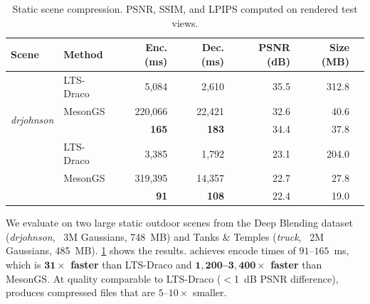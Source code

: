 %
\begin{table}[t]
  \centering
  {
  \begin{tabular}{l|l|rr|rrr}
    \hline
    \textbf{Scene} & \textbf{Method} & \textbf{Enc.} (ms) & \textbf{Dec.} (ms) & \textbf{PSNR} (dB) & \textbf{Size} (MB) \\
    \hline\hline
    \multirow{4}{*}{\textit{drjohnson}}
      & LTS-Draco            & 5,084    & 2,610   & 35.5 & 312.8 \\
      & MesonGS              & 220,066  & 22,421  & 32.6 & 40.6 \\
      & \textbf{\gsnfs{}}  & \textbf{165} & \textbf{183} & 34.4 & 37.8 \\
    \hline
    \multirow{4}{*}{\textit{truck}}
      & LTS-Draco            & 3,385    & 1,792   & 23.1 & 204.0 \\
      & MesonGS              & 319,395  & 14,357  & 22.7 & 27.8 \\
      & \textbf{\gsnfs{}}  & \textbf{91} & \textbf{108} & 22.4 & 19.0 \\
    \hline
  \end{tabular}
  }
  \caption{Static \gs{} scene compression. PSNR, SSIM, and LPIPS computed on rendered test views.}
  \label{tab:static-scenes}
\end{table}
%
We evaluate \gsnfs{} on two large static outdoor scenes from the Deep Blending dataset (\textit{drjohnson}, ~3M Gaussians, 748~MB) and Tanks \& Temples (\textit{truck}, ~2M Gaussians, 485~MB).
%
%
\cref{tab:static-scenes} shows the results.
%
\gsnfs{} achieves encode times of $91$--$165$~ms, which is \textbf{$\boldsymbol{31\times}$ faster} than LTS-Draco and \textbf{$\boldsymbol{1{,}200}$--$\boldsymbol{3{,}400\times}$ faster} than MesonGS.
%
At quality comparable to LTS-Draco ($<$1~dB PSNR difference), \gsnfs{} produces compressed files that are $5$--$10\times$ smaller.
%

